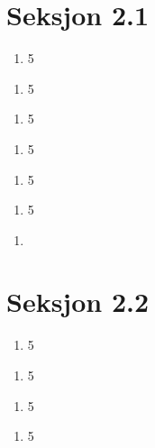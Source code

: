 
\section*{Seksjon 2.1}

\begin{problem}[3]
  \begin{enumerate}
  \addtocounter{enumii}{1}
    \item 5 
  \end{enumerate}
  
  \begin{enumerate}[resume]
  \addtocounter{enumii}{1}
    \item 5 
  \end{enumerate}
\end{problem}
%
\begin{problem}[8]
  \begin{enumerate}
  \addtocounter{enumii}{3}
    \item 5 
  \end{enumerate}
  \begin{enumerate}[resume]
    \item 5 
  \end{enumerate}
  \begin{enumerate}[resume]
    \item 5 
  \end{enumerate}
  \begin{enumerate}[resume]
    \item 5 
  \end{enumerate}
  \begin{enumerate}[resume]
    \item
  \end{enumerate}
\end{problem}
%
\begin{problem}[15]
\end{problem}

\section*{Seksjon 2.2}

\begin{problem}[3]
  \begin{enumerate}
  \addtocounter{enumii}{1}
    \item 5 
  \end{enumerate}
  \begin{enumerate}[resume]
  \addtocounter{enumii}{1}
    \item 5 
  \end{enumerate}
\end{problem}
%
\begin{problem}[3]
  \begin{enumerate}
    \item 5 
  \end{enumerate}
  \begin{enumerate}[resume]
    \item 5 
  \end{enumerate}
\end{problem}

